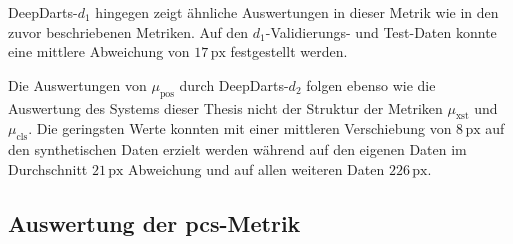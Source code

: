DeepDarts-$d_1$ hingegen zeigt ähnliche Auswertungen in dieser Metrik wie in den zuvor beschriebenen Metriken. Auf den $d_1$-Validierungs- und Test-Daten konnte eine mittlere Abweichung von $17\,\text{px}$ festgestellt werden.

Die Auswertungen von $\mu_\text{pos}$ durch DeepDarts-$d_2$ folgen ebenso wie die Auswertung des Systems dieser Thesis nicht der Struktur der Metriken $\mu_\text{xst}$ und $\mu_\text{cls}$. Die geringsten Werte konnten mit einer mittleren Verschiebung von $8\,\text{px}$ auf den synthetischen Daten erzielt werden während auf den eigenen Daten im Durchschnitt $21\,\text{px}$ Abweichung und auf allen weiteren Daten $226\,\text{px}$.


\subsection{Auswertung der \acs{pcs}-Metrik}
\label{sec:auswertung_pcs}

\NNPCS

